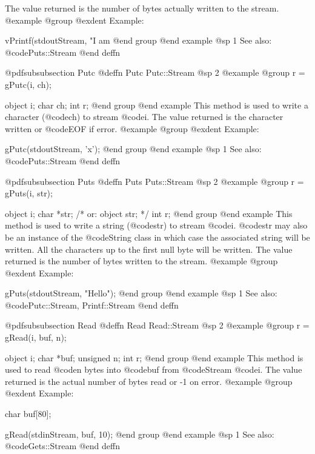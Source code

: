 The value returned is the number of bytes actually written to the stream.
@example
@group
@exdent Example:
 
vPrintf(stdoutStream, "I am %
@end group
@end example
@sp 1
See also:  @code{Puts::Stream}
@end deffn







@pdfsubsubsection {Putc}
@deffn {Putc} Putc::Stream
@sp 2
@example
@group
r = gPutc(i, ch);

object  i;
char    ch;
int     r;
@end group
@end example
This method is used to write a character (@code{ch}) to stream @code{i}.
The value returned is the character written or @code{EOF} if error.
@example
@group
@exdent Example:
 
gPutc(stdoutStream, 'x');
@end group
@end example
@sp 1
See also:  @code{Puts::Stream}
@end deffn










@pdfsubsubsection {Puts}
@deffn {Puts} Puts::Stream
@sp 2
@example
@group
r = gPuts(i, str);

object  i;
char    *str;  /*  or:  object str;  */
int     r;
@end group
@end example
This method is used to write a string (@code{str}) to stream @code{i}.
@code{str} may also be an instance of the @code{String} class in which
case the associated string will be written.  All the characters up to
the first null byte will be written.  The value returned is the number
of bytes written to the stream.
@example
@group
@exdent Example:
 
gPuts(stdoutStream, "Hello\n");
@end group
@end example
@sp 1
See also:  @code{Putc::Stream, Printf::Stream}
@end deffn










@pdfsubsubsection {Read}
@deffn {Read} Read::Stream
@sp 2
@example
@group
r = gRead(i, buf, n);

object  i;
char    *buf;
unsigned n;
int     r;
@end group
@end example
This method is used to read @code{n} bytes into @code{buf} from
@code{Stream} @code{i}.  The value returned is the actual number
of bytes read or -1 on error.
@example
@group
@exdent Example:
 
char    buf[80];

gRead(stdinStream, buf, 10);
@end group
@end example
@sp 1
See also:  @code{Gets::Stream}
@end deffn











